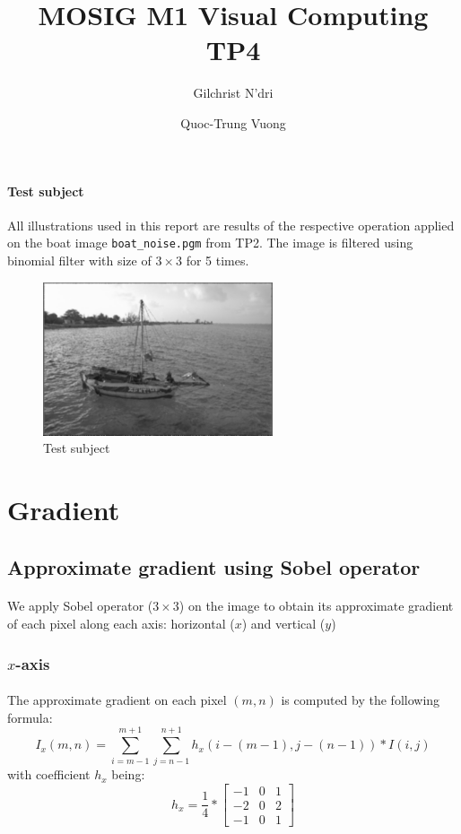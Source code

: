 \documentclass[a4paper, 10pt]{article}
\title{MOSIG M1 Visual Computing TP4}
\date{}
\author{Gilchrist N'dri \and Quoc-Trung Vuong}
\begin{document}
\maketitle

\paragraph{Test subject} All illustrations used in this report are results of the respective operation applied on the boat image \texttt{boat\_noise.pgm} from TP2. The image is filtered using binomial filter with size of $3\times3$ for 5 times.
\begin{figure}[!htb]
\centering
\includegraphics[width=256px]{boat3x3_5.png}
\caption{Test subject}
\label{fig-subject}
\end{figure}


\section{Gradient}
\subsection{Approximate gradient using Sobel operator}
\paragraph{} We apply Sobel operator ($3\times3$) on the image to obtain its approximate gradient of each pixel along each axis: horizontal ($x$) and vertical ($y$)
\subsubsection{$x$-axis}
\paragraph{} The approximate gradient on each pixel $(m,n)$ is computed by the following formula:
\begin{equation}
I_x(m,n) = \sum_{i=m-1}^{m+1}\sum_{j=n-1}^{n+1}{h_x(i-(m-1),j-(n-1)) * I(i,j)}
\end{equation}
with coefficient $h_x$ being:
\begin{equation}
h_x = \frac{1}{4} * \left[
\begin{matrix}
-1 & 0 & 1 \\
-2 & 0 & 2 \\
-1 & 0 & 1
\end{matrix}
\right]
\end{equation}
\end{document}
